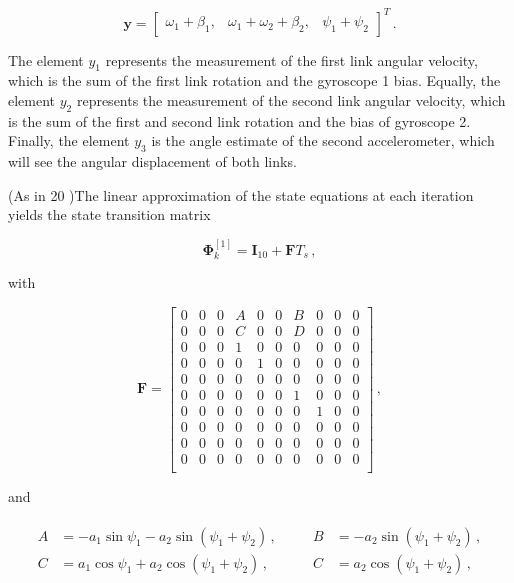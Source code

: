 \begin{equation} \label{eq:measurement_vector}
  \mathbf{y} = \begin{bmatrix}
  	\omega_1 + \beta_1, & \omega_1 + \omega_2 + \beta_2, & \psi_1 + \psi_2
  \end{bmatrix}^T\,.
\end{equation}
 
\noindent
The element $y_1$ represents the measurement of the first link angular velocity, which is the sum of the first link rotation and the gyroscope 1 bias. Equally, the element $y_2$ represents the measurement of the second link angular velocity, which is the sum of the first and second link rotation and the bias of gyroscope 2. Finally, the element $y_3$ is the angle estimate of the second accelerometer, which will see the angular displacement of both links.

(As in 20 )The linear approximation of the state equations at each iteration yields the state transition matrix

\begin{equation}
  \bm{\Phi}^{[1]}_{k} =  \mathbf{I}_{10} + \mathbf{F} T_s\,,
\end{equation}

\noindent
with

\begin{equation}
\mathbf{F} = \begin{bmatrix}
  0 & 0 & 0 & A & 0 & 0 & B & 0 & 0 & 0\\
  0 & 0 & 0 & C & 0 & 0 & D & 0 & 0 & 0\\
  0 & 0 & 0 & 1 & 0 & 0 & 0 & 0 & 0 & 0\\
  0 & 0 & 0 & 0 & 1 & 0 & 0 & 0 & 0 & 0\\
  0 & 0 & 0 & 0 & 0 & 0 & 0 & 0 & 0 & 0\\
  0 & 0 & 0 & 0 & 0 & 0 & 1 & 0 & 0 & 0\\
  0 & 0 & 0 & 0 & 0 & 0 & 0 & 1 & 0 & 0\\
  0 & 0 & 0 & 0 & 0 & 0 & 0 & 0 & 0 & 0\\
  0 & 0 & 0 & 0 & 0 & 0 & 0 & 0 & 0 & 0\\
  0 & 0 & 0 & 0 & 0 & 0 & 0 & 0 & 0 & 0\\
\end{bmatrix}\,,
\end{equation}

\noindent
and

\begin{equation*}
  \begin{array}{cc}
  \begin{split}
  	A &= -a_1 \sin \psi_1 -a_2 \sin (\psi_1 + \psi_2)\,, \quad \\
  	C &= a_1 \cos \psi_1 + a_2 \cos (\psi_1 + \psi_2)\,,
  \end{split} &
  \begin{split}
  B &= -a_2 \sin (\psi_1 + \psi_2)\,, \\
  C &= a_2 \cos (\psi_1 + \psi_2)\,,	
  \end{split}
\end{array}
\end{equation*}


